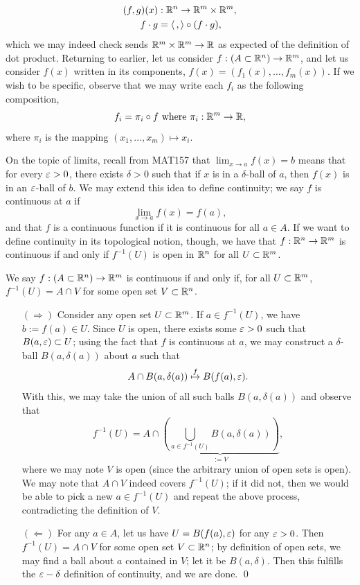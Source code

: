 \begin{align*}
    (f, g)(x) &: \mathbb R^n \to \mathbb R^m \times \mathbb R^m, \\
    f \cdot g &= \left< \, , \right> \circ (f \cdot g), 
\end{align*}
which we may indeed check sends $\mathbb R^m \times \mathbb R^m \to \mathbb R$ as expected of the definition of dot product.
\medskip\newline
\noindent Returning to earlier, let us consider $f : (A \subset \mathbb R^n) \to \mathbb R^m$, and let us consider $f(x)$ written in its components, $f(x) = (f_1(x), \dots, f_m(x))$. If we wish to be specific, observe that we may write each $f_i$ as the following composition,
\[ f_i = \pi_i \circ f \text{ where } \pi_i : \mathbb R^m \to \mathbb R, \]
where $\pi_i$ is the mapping $(x_1, \dots, x_m) \mapsto x_i$.

\newpage
\noindent On the topic of limits, recall from MAT157 that $\lim_{x \to a} f(x) = b$ means that for every $\varepsilon > 0$, there exists $\delta > 0$ such that if $x$ is in a $\delta$-ball of $a$, then $f(x)$ is in an $\varepsilon$-ball of $b$. We may extend this idea to define continuity; we say $f$ is continuous at $a$ if
\[ \lim_{x \to a} f(x) = f(a), \]
and that $f$ is a continuous function if it is continuous for all $a \in A$. If we want to define continuity in its topological notion, though, we have that $f : \mathbb R^n \to \mathbb R^m$ is continuous if and only if $f^{-1}(U)$ is open in $\mathbb R^n$ for all $U \subset \mathbb R^m$.
\begin{simplethm}
    We say $f : (A \subset \mathbb R^n) \to \mathbb R^m$ is continuous if and only if, for all $U \subset \mathbb R^m$, $f^{-1}(U) = A \cap V$ for some open set $V \subset \mathbb R^n$.
\end{simplethm}
\begin{itemize}
    \item[$(\Rightarrow)$] Consider any open set $U \subset \mathbb R^m$. If $a \in f^{-1}(U)$, we have $b := f(a) \in U$. Since $U$ is open, there exists some $\varepsilon > 0$ such that $B(a, \varepsilon) \subset U$; using the fact that $f$ is continuous at $a$, we may construct a $\delta$-ball $B(a, \delta(a))$ about $a$ such that
    \[ A \cap B(a, \delta(a)) \stackrel{f}{\mapsto} B(f(a), \varepsilon). \]
    With this, we may take the union of all such balls $B(a, \delta(a))$ and observe that
    \[ f^{-1}(U) = A \cap \underbrace{\left(\bigcup_{a \in f^{-1}(U)} B(a, \delta(a))\right)}_{:= V}, \]
    where we may note $V$ is open (since the arbitrary union of open sets is open). We may note that $A \cap V$ indeed covers $f^{-1}(U)$; if it did not, then we would be able to pick a new $a \in f^{-1}(U)$ and repeat the above process, contradicting the definition of $V$.

    \item[$(\Leftarrow)$] For any $a \in A$, let us have $U = B(f(a), \varepsilon)$ for any $\varepsilon > 0$. Then $f^{-1}(U) = A \cap V$ for some open set $V \subset \mathbb R^n$; by definition of open sets, we may find a ball about $a$ contained in $V$; let it be $B(a, \delta)$. Then this fulfills the $\varepsilon-\delta$ definition of continuity, and we are done. \qed 
\end{itemize}